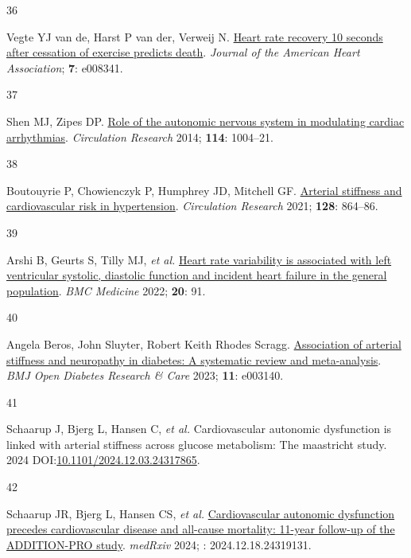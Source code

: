 \documentclass[
  a4paper,
  headsepline=true,
  open=any]{scrbook}
\newlength{\cslhangindent}
\newlength{\csllabelwidth}
\newlength{\cslentryspacingunit} %
\newenvironment{CSLReferences}[2] %
 {%
  \setlength{\parindent}{0pt}
  \ifodd #1
  \let\oldpar\par
  \def\par{\hangindent=\cslhangindent\oldpar}
  \fi
  \setlength{\parskip}{#2\cslentryspacingunit}
 }%
 {}
\newcommand{\CSLLeftMargin}[1]{\parbox[t]{\csllabelwidth}{#1}}
\newcommand{\CSLRightInline}[1]{\parbox[t]{\linewidth - \csllabelwidth}{#1}\break}
\begin{document}
\begin{CSLReferences}{0}{0}
\leavevmode{}%
\CSLLeftMargin{36 }%
\CSLRightInline{Vegte YJ van de, Harst P van der, Verweij N.
\href{https://doi.org/10.1161/JAHA.117.008341}{Heart rate recovery 10
seconds after cessation of exercise predicts death}. \emph{Journal of
the American Heart Association}; \textbf{7}: e008341.}

\leavevmode{}%
\CSLLeftMargin{37 }%
\CSLRightInline{Shen MJ, Zipes DP.
\href{https://doi.org/10.1161/CIRCRESAHA.113.302549}{Role of the
autonomic nervous system in modulating cardiac arrhythmias}.
\emph{Circulation Research} 2014; \textbf{114}: 1004--21.}

\leavevmode{}%
\CSLLeftMargin{38 }%
\CSLRightInline{Boutouyrie P, Chowienczyk P, Humphrey JD, Mitchell GF.
\href{https://doi.org/10.1161/CIRCRESAHA.121.318061}{Arterial stiffness
and cardiovascular risk in hypertension}. \emph{Circulation Research}
2021; \textbf{128}: 864--86.}

\leavevmode{}%
\CSLLeftMargin{39 }%
\CSLRightInline{Arshi B, Geurts S, Tilly MJ, \emph{et al.}
\href{https://doi.org/10.1186/s12916-022-02273-9}{Heart rate variability
is associated with left ventricular systolic, diastolic function and
incident heart failure in the general population}. \emph{BMC Medicine}
2022; \textbf{20}: 91.}

\leavevmode{}%
\CSLLeftMargin{40 }%
\CSLRightInline{Angela Beros, John Sluyter, Robert Keith Rhodes Scragg.
\href{https://doi.org/10.1136/bmjdrc-2022-003140}{Association of
arterial stiffness and neuropathy in diabetes: A systematic review and
meta-analysis}. \emph{BMJ Open Diabetes Research \& Care} 2023;
\textbf{11}: e003140.}

\leavevmode{}%
\CSLLeftMargin{41 }%
\CSLRightInline{Schaarup J, Bjerg L, Hansen C, \emph{et al.}
Cardiovascular autonomic dysfunction is linked with arterial stiffness
across glucose metabolism: The maastricht study. 2024
DOI:\href{https://doi.org/10.1101/2024.12.03.24317865}{10.1101/2024.12.03.24317865}.}

\leavevmode{}%
\CSLLeftMargin{42 }%
\CSLRightInline{Schaarup JR, Bjerg L, Hansen CS, \emph{et al.}
\href{https://doi.org/10.1101/2024.12.18.24319131}{Cardiovascular
autonomic dysfunction precedes cardiovascular disease and all-cause
mortality: 11-year follow-up of the ADDITION-PRO study}. \emph{medRxiv}
2024; : 2024.12.18.24319131.}


\end{CSLReferences}
\end{document}
